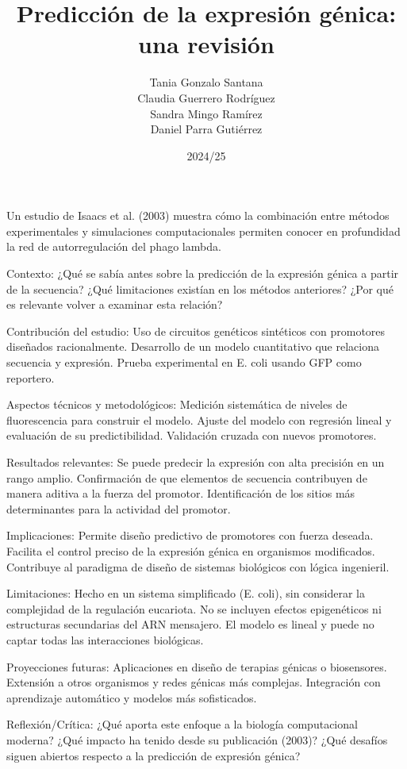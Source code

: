 \documentclass[nochap]{config/ejercicios}
\title{Predicción de la expresión génica: una revisión}
\author{Tania Gonzalo Santana \\ Claudia Guerrero Rodríguez \\ Sandra Mingo Ramírez \\ Daniel Parra Gutiérrez }
\date{2024/25}
\begin{document}
\maketitle

Un estudio de Isaacs et al. (2003) muestra cómo la combinación entre métodos experimentales y simulaciones computacionales permiten conocer en profundidad la red de autorregulación del phago lambda.

Contexto:
¿Qué se sabía antes sobre la predicción de la expresión génica a partir de la secuencia?
¿Qué limitaciones existían en los métodos anteriores?
¿Por qué es relevante volver a examinar esta relación?

Contribución del estudio: 
Uso de circuitos genéticos sintéticos con promotores diseñados racionalmente.
Desarrollo de un modelo cuantitativo que relaciona secuencia y expresión.
Prueba experimental en E. coli usando GFP como reportero.

Aspectos técnicos y metodológicos:
Medición sistemática de niveles de fluorescencia para construir el modelo.
Ajuste del modelo con regresión lineal y evaluación de su predictibilidad.
Validación cruzada con nuevos promotores.

Resultados relevantes:
Se puede predecir la expresión con alta precisión en un rango amplio.
Confirmación de que elementos de secuencia contribuyen de manera aditiva a la fuerza del promotor.
Identificación de los sitios más determinantes para la actividad del promotor.

Implicaciones:
Permite diseño predictivo de promotores con fuerza deseada.
Facilita el control preciso de la expresión génica en organismos modificados.
Contribuye al paradigma de diseño de sistemas biológicos con lógica ingenieril.

Limitaciones:
Hecho en un sistema simplificado (E. coli), sin considerar la complejidad de la regulación eucariota.
No se incluyen efectos epigenéticos ni estructuras secundarias del ARN mensajero.
El modelo es lineal y puede no captar todas las interacciones biológicas.

Proyecciones futuras:
Aplicaciones en diseño de terapias génicas o biosensores.
Extensión a otros organismos y redes génicas más complejas.
Integración con aprendizaje automático y modelos más sofisticados.

Reflexión/Crítica:
¿Qué aporta este enfoque a la biología computacional moderna?
¿Qué impacto ha tenido desde su publicación (2003)?
¿Qué desafíos siguen abiertos respecto a la predicción de expresión génica?
\end{document}
